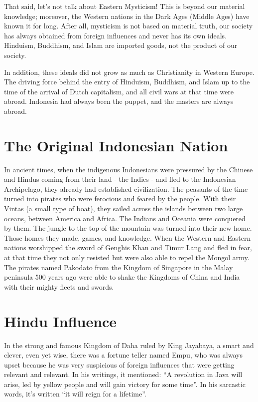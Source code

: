 That said, let's not talk about Eastern Mysticism! This is beyond our material knowledge; moreover, 
the Western nations in the Dark Ages (Middle Ages) have known it for long. After all, mysticism is 
not based on material truth, our society has always obtained from foreign influences and never has 
its own ideals. Hinduism, Buddhism, and Islam are imported goods, not the product of our society.\nline

In addition, these ideals did not grow as much as Christianity in Western Europe. 
The driving force behind the entry of Hinduism, Buddhism, and Islam up to the time of 
the arrival of Dutch capitalism, and all civil wars at that time were abroad. Indonesia 
had always been the puppet, and the masters are always abroad.

\section{The Original Indonesian Nation}

In ancient times, when the indigenous Indonesians were 
pressured by the Chinese and Hindus coming from their land - the Indies - and 
fled to the Indonesian Archipelago, they already had established civilization. 
The peasants of the time turned into pirates who were ferocious and feared by the people. 
With their Vintas (a small type of boat), they sailed across the islands between two large 
oceans, between America and Africa. The Indians and Oceania were conquered by them. The jungle 
to the top of the mountain was turned into their new home. Those homes they made, games, 
and knowledge. When the Western and Eastern nations worshipped the sword of Genghis Khan and 
Timur Lang and fled in fear, at that time they not only resisted but were also able to repel 
the Mongol army. The pirates named Pakodato from the Kingdom of Singapore in the Malay peninsula 
500 years ago were able to shake the Kingdoms of China and India with their mighty fleets and swords.

\section{Hindu Influence}

In the strong and famous Kingdom of Daha ruled by King Jayabaya, a smart and clever, 
even yet wise, there was a fortune teller named Empu, who was always upset because he 
was very suspicious of foreign influences that were getting relevant and relevant. 
In his writings, it mentioned: “A revolution in Java will arise, led 
by yellow people and will gain victory for some time”. In his sarcastic 
words, it's written “it will reign for a lifetime”.\nline

